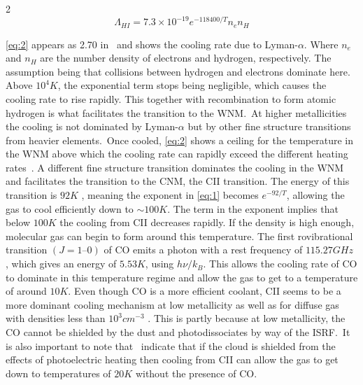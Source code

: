 \documentclass[a4paper,11pt]{article}
\begin{document}
\begin{multicols}{2}
\begin{equation}
    \Lambda_{H\!I} = 7.3\times10^{-19}e^{-118400/T}n_e n_H\label{eq:2}
    \tag{2}
\end{equation}

\par\noindent \autoref{eq:2} appears as 2.70 in\ \cite{Chemistry} and shows the cooling rate due to Lyman-$\alpha$. Where $n_e$ and $n_H$ are the number density of electrons and hydrogen, respectively. The assumption being that collisions between hydrogen and electrons dominate here. Above $10^4K$, the exponential term stops being negligible, which causes the cooling rate to rise rapidly. This together with recombination to form atomic hydrogen is what facilitates the transition to the WNM.\ At higher metallicities the cooling is not dominated by Lyman-$\alpha$ but by other fine structure transitions from heavier elements.\ Once cooled, \autoref{eq:2} shows a ceiling for the temperature in the WNM above which the cooling rate can rapidly exceed the different heating rates\ \parencite{Heating_Cooling}. A different fine structure transition dominates the cooling in the WNM and facilitates the transition to the CNM, the CII transition. The energy of this transition is $92K$ \parencite{Cooling_Heating}, meaning the exponent in \autoref{eq:1} becomes $e^{-92/T}$, allowing the gas to cool efficiently down to $\sim\!\!100K$. The term in the exponent implies that below $100K$ the cooling from CII decreases rapidly. If the density is high enough, molecular gas can begin to form around this temperature. The first rovibrational transition $(J\!=\!1\text{–}0)$ of CO emits a photon with a rest frequency of $115.27GHz$ \parencite{CO_1_0}, which gives an energy of $5.53K$, using $h\nu/k_B$. This allows the cooling rate of CO to dominate in this temperature regime and allow the gas to get to a temperature of around $10K$. Even though CO is a more efficient coolant, CII seems to be a more dominant cooling mechanism at low metallicity as well as for diffuse gas with densities less than $10^3 cm^{-3}$ \parencite{CO_cooling}. This is partly because at low metallicity, the CO cannot be shielded by the dust and photodissociates by way of the ISRF.\ It is also important to note that\ \cite{CO_cooling} indicate that if the cloud is shielded from the effects of photoelectric heating then cooling from CII can allow the gas to get down to temperatures of $20K$ without the presence of CO.\
\smallskip

\end{multicols}
\end{document}
